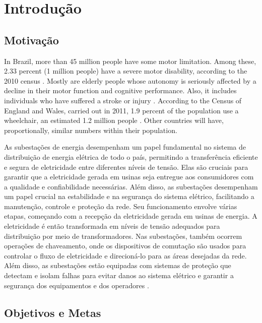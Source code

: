 \chapter{Introdução}


\section{Motivação}
\label{sec:motivation}

In Brazil, more than 45 million people have some motor limitation. Among these, 2.33 percent (1 million people) have a severe motor disability, according to the 2010 census \cite{gonzaga2023}. Mostly are elderly people whose autonomy is seriously affected by a decline in their motor function and cognitive performance. Also, it includes individuals who have suffered a stroke or injury \cite{gonzaga2023}. According to the Census of England and Wales, carried out in 2011, 1.9 percent of the population use a wheelchair, an estimated 1.2 million people \cite{gonzaga2023}. Other countries will have, proportionally, similar numbers within their population.

As subestações de energia desempenham um papel fundamental no sistema de distribuição de energia elétrica de todo o país, permitindo a transferência eficiente e segura de eletricidade entre diferentes níveis de tensão. Elas são cruciais para garantir que a eletricidade gerada em usinas seja entregue aos consumidores com a qualidade e confiabilidade necessárias. Além disso, as subestações desempenham um papel crucial na estabilidade e na segurança do sistema elétrico, facilitando a manutenção, controle e proteção da rede. Seu funcionamento envolve várias etapas, começando com a recepção da eletricidade gerada em usinas de energia. A eletricidade é então transformada em níveis de tensão adequados para distribuição por meio de transformadores. Nas subestações, também ocorrem operações de chaveamento, onde os dispositivos de comutação são usados para controlar o fluxo de eletricidade e direcioná-lo para as áreas desejadas da rede. Além disso, as subestações estão equipadas com sistemas de proteção que detectam e isolam falhas para evitar danos ao sistema elétrico e garantir a segurança dos equipamentos e dos operadores \cite{randolph2013electric}.


\section{Objetivos e Metas}

